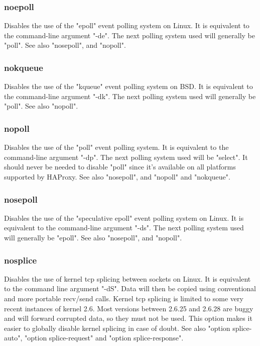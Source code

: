 \subsubsection[noepoll]{noepoll}
  Disables the use of the "epoll" event polling system on Linux. It is
  equivalent to the command-line argument "-de". The next polling system
  used will generally be "poll". See also "nosepoll", and "nopoll".

\subsubsection[nokqueue]{nokqueue}
  Disables the use of the "kqueue" event polling system on BSD. It is
  equivalent to the command-line argument "-dk". The next polling system
  used will generally be "poll". See also "nopoll".

\subsubsection[nopoll]{nopoll}
  Disables the use of the "poll" event polling system. It is equivalent to the
  command-line argument "-dp". The next polling system used will be "select".
  It should never be needed to disable "poll" since it's available on all
  platforms supported by HAProxy. See also "nosepoll", and "nopoll" and
  "nokqueue".

\subsubsection[nosepoll]{nosepoll}
  Disables the use of the "speculative epoll" event polling system on Linux. It
  is equivalent to the command-line argument "-ds". The next polling system
  used will generally be "epoll". See also "nosepoll", and "nopoll".

\subsubsection[nosplice]{nosplice}
  Disables the use of kernel tcp splicing between sockets on Linux. It is
  equivalent to the command line argument "-dS".  Data will then be copied
  using conventional and more portable recv/send calls. Kernel tcp splicing is
  limited to some very recent instances of kernel 2.6. Most versions between
  2.6.25 and 2.6.28 are buggy and will forward corrupted data, so they must not
  be used. This option makes it easier to globally disable kernel splicing in
  case of doubt. See also "option splice-auto", "option splice-request" and
  "option splice-response".

